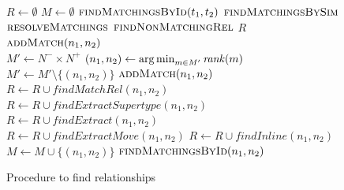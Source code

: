 \begin{figure}[htbp]
\begin{algorithmic}[1]
\State $R \gets \emptyset$
\State $M \gets \emptyset$
\State $\textsc{findMatchingsById}(t_1,t_2)$
\State $\textsc{findMatchingsBySim}$
\State $\textsc{resolveMatchings}$
\State $\textsc{findNonMatchingRel}$
\State \Return $R$
\\
    \State $\textsc{addMatch}(n_1, n_2)$
  \EndIf
\EndFor
\EndProcedure
\\
\State $M' \gets N^- \times N^+$
  \State $(n_1, n_2) \gets \operatorname*{arg\,min}_{m \in M'} \operatorname{\mathit{rank}}(m)$
  \State $M' \gets M' \setminus \{(n_1, n_2)\}$
    \State $\textsc{addMatch}(n_1, n_2)$
  \EndIf
\EndWhile
\EndProcedure
\\
  \State $R \gets R \cup \mathit{findMatchRel}(n_1, n_2)$
\EndFor
\EndProcedure
\\
  \State $R \gets R \cup \mathit{findExtractSupertype}(n_1, n_2)$
  \State $R \gets R \cup \mathit{findExtract}(n_1, n_2)$
  \State $R \gets R \cup \mathit{findExtractMove}(n_1, n_2)$
\EndFor
{}
  \State $R \gets R \cup \mathit{findInline}(n_1, n_2)$
\EndFor
\EndProcedure
\\
  \State $M \gets M \cup \{(n_1, n_2)\}$
  \State $\textsc{findMatchingsById}(n_1,n_2)$
\EndIf
\EndProcedure
\\
\EndProcedure

\end{algorithmic}
\caption{Procedure to find relationships}
\label{AlgoGeneral}
\end{figure}

